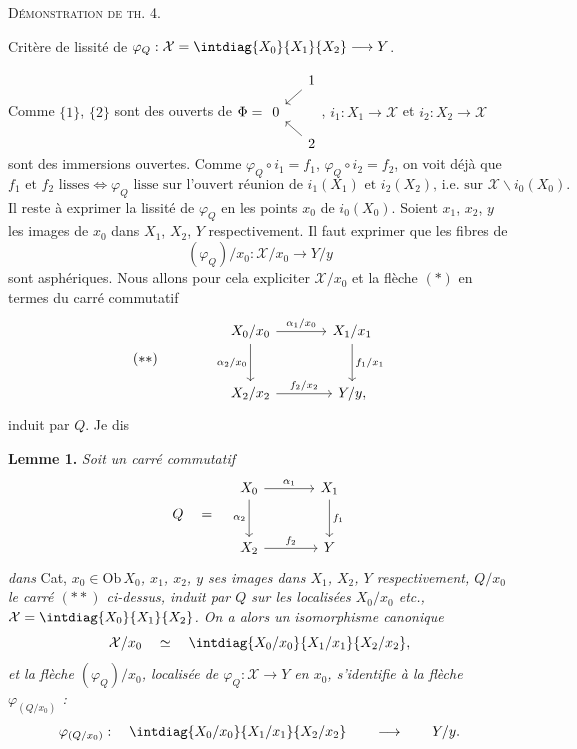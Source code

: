 \noindent\textsc{Démonstration de th. 4.}

\noindent{} Critère de lissité de $\varphi_Q : \mathcal{X} = \intdiag{X_0}{X_1}{X_2} \longrightarrow Y$.

Comme $\{1\}$, $\{2\}$ sont des ouverts de $\Phi = \begin{tikzcd}[row sep=small,column sep=small,baseline=(\tikzcdmatrixname-2-1.base)]
 & 1 \arrow[dl] \\
 0 & \\
 & 2 \arrow[ul]
\end{tikzcd}$, $i_1 : X_1\longrightarrow\mathcal{X}$ et $i_2 : X_2\longrightarrow\mathcal{X}$ sont des immersions ouvertes. Comme $\varphi_Q\circ i_1 = f_1$,
$\varphi_Q\circ i_2=f_2$, on voit déjà que
\[
f_1 \text{ et } f_2 \text{ lisses} \iff \varphi_Q \text{ lisse sur l'ouvert réunion de } i_1(X_1) \text{ et } i_2(X_2)\text{, i.e. sur } \mathcal{X}\backslash i_0(X_0).
\]
Il reste à exprimer la lissité de $\varphi_Q$ en les points $x_0$ de $i_0(X_0)$. Soient $x_1$, $x_2$, $y$ les images de $x_0$ dans $X_1$, $X_2$, $Y$ respectivement. Il faut exprimer que les fibres de
\[
(\varphi_Q)/x_0 : \mathcal{X}/x_0\longrightarrow Y/y \tag*{$(*)$}
\]
sont asphériques. Nous allons pour cela expliciter $\mathcal{X}/x_0$ et la flèche $(*)$ en termes du carré commutatif
\[
(**)\qquad\qquad
\begin{tikzcd}[row sep=large,column sep=large]
X_0/x_0 \arrow[r, "\alpha_1/x_0"] \arrow[d, "\alpha_2/x_0"'] & X_1/x_1 \arrow[d, "f_1/x_1"] \\
X_2/x_2 \arrow[r, "f_2/x_2"] & Y/y,
\end{tikzcd}
\]
induit par $Q$. Je dis

\noindent\textbf{Lemme 1.} \textit{Soit un carré commutatif}
\[
Q \quad = \quad
\begin{tikzcd}[row sep=large,column sep=large]
X_0 \arrow[r, "\alpha_1"] \arrow[d, "\alpha_2"'] & X_1 \arrow[d, "f_1"] \\
X_2 \arrow[r, "f_2"] & Y
\end{tikzcd}
\]
\textit{dans} Cat, \textit{$x_0\in\mathrm{Ob}\,X_0$, $x_1$, $x_2$, $y$ ses images dans $X_1$, $X_2$, $Y$ respectivement, $Q/x_0$ le carré $(**)$ ci-dessus, induit par $Q$ sur les localisées $X_0/x_0$ etc., $\mathcal{X} = \intdiag{X_0}{X_1}{X_2}$. On a alors un}
\textit{isomorphisme canonique}
\[
\mathcal{X}/x_0 \quad\simeq\quad \intdiag{X_0/x_0}{X_1/x_1}{X_2/x_2} ,
\]
\textit{et la flèche $(\varphi_Q)/x_0$, localisée de $\varphi_Q : \mathcal{X}\longrightarrow Y$ en $x_0$, s'identifie à la flèche $\varphi_{(Q/x_0)}$ :}
\[
\varphi_{(Q/x_0)} : \quad \intdiag{X_0/x_0}{X_1/x_1}{X_2/x_2} \qquad\longrightarrow\qquad Y/y.
\]

